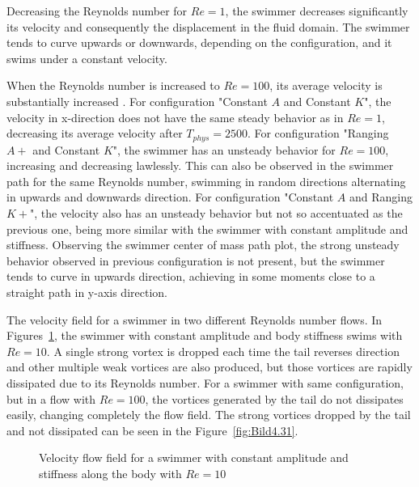 Decreasing the Reynolds number for $Re=1$, the swimmer decreases significantly its velocity and consequently the displacement in the fluid domain. The swimmer tends to curve upwards
or downwards, depending on the configuration, and it swims under a constant velocity.\par
When the Reynolds number is increased to $Re=100$, its average velocity is substantially increased . For configuration "Constant $A$ and Constant $K$", the velocity in x-direction 
does not have the same steady behavior as in $Re=1$, decreasing its average velocity after $T_{phys}= 2500$.  For configuration "Ranging $A+$ and Constant $K$", the swimmer 
has an unsteady behavior for $Re=100$, increasing and decreasing lawlessly. This can also be observed in the swimmer path for the same Reynolds number, swimming in random directions alternating
in upwards and downwards direction. For configuration "Constant $A$ and Ranging $K+$", the velocity also has an unsteady behavior but not so accentuated as the previous one, being
more similar with the swimmer with constant amplitude and stiffness. Observing the swimmer center of mass path plot, the strong unsteady behavior observed in previous configuration
is not present, but the swimmer tends to curve in upwards direction, achieving in some moments close to a straight path in y-axis direction.\par

The velocity field for a swimmer in two different Reynolds number flows. In Figures~\ref{fig:Bild4.30}, the swimmer with constant
amplitude and body stiffness swims with $Re=10$. A single strong vortex is dropped each time the tail reverses direction and other multiple weak vortices are also produced, but
those vortices are rapidly dissipated due to its Reynolds number. For a swimmer with same configuration, but in a flow with $Re=100$, the vortices generated by the tail do not 
dissipates easily, changing completely the flow field. The strong vortices dropped by the tail and not dissipated can be seen in the Figure~\ref{fig:Bild4.31}.






\begin{figure}[H]
\centering
  \begin{footnotesize}
  
  \caption[Velocity flow field for a swimmer with constant amplitude and stiffness along the body with $Re=10$]{Velocity flow field for a swimmer with constant amplitude and stiffness along the body with $Re=10$}
   \label{fig:Bild4.30}
  \end{footnotesize}
\end{figure}


